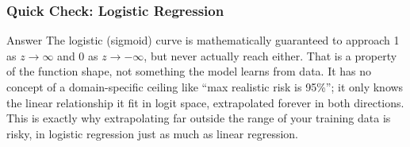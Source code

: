 \begin{frame}[fragile]\frametitle{Quick Check: Logistic Regression}
\begin{block}{Answer}
The logistic (sigmoid) curve is mathematically guaranteed to approach 1 as $z \to \infty$ and 0 as $z \to -\infty$, but never actually reach either. That is a property of the function shape, not something the model learns from data. It has no concept of a domain-specific ceiling like ``max realistic risk is 95\%''; it only knows the linear relationship it fit in logit space, extrapolated forever in both directions. This is exactly why extrapolating far outside the range of your training data is risky, in logistic regression just as much as linear regression.
\end{block}
\end{frame}
